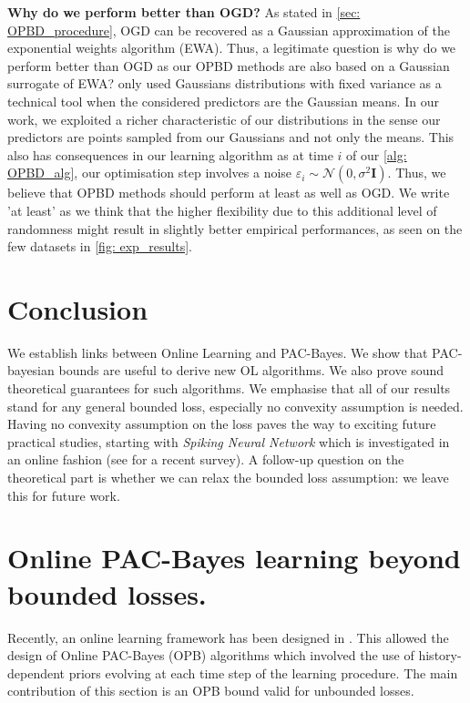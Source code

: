 \textbf{Why do we perform better than OGD?} As stated in \cref{sec: OPBD_procedure}, OGD can be recovered as a Gaussian approximation of the exponential weights algorithm (EWA). Thus, a legitimate question is why do we perform better than OGD as our OPBD methods are also based on a Gaussian surrogate of EWA?  \cite{hoeven2018many} only used Gaussians distributions with fixed variance as a technical tool when the considered predictors are the Gaussian means. In our work, we exploited a richer characteristic of our distributions in the sense our predictors are points sampled from our Gaussians and not only the means. This also has consequences in our learning algorithm as at time $i$ of our \cref{alg: OPBD_alg}, our optimisation step involves a noise $\varepsilon_i\sim \mathcal{N}(0,\sigma^2\mathbf{I})$. Thus, we believe that OPBD methods should perform at least as well as OGD.
We write 'at least' as we think that the higher flexibility due to this additional level of randomness might result in slightly better empirical performances, as seen on the few datasets in \cref{fig: exp_results}.




\section{Conclusion}

We establish links between Online Learning and PAC-Bayes. We show that PAC-bayesian bounds are useful to derive new OL algorithms. We also prove sound theoretical guarantees for such algorithms. We emphasise that all of our results stand for any general bounded loss, especially no convexity assumption is needed.
Having no convexity assumption on the loss paves the way to exciting future practical studies, starting with \emph{Spiking Neural Network} which is investigated in an online fashion (see \citealp{lobo2020spiking} for a recent survey). A follow-up question on the theoretical part is whether we can relax the bounded loss assumption: we leave this for future work.









\section{Online PAC-Bayes learning beyond bounded losses.}
\label{sec: main_result_onl}

Recently, an online learning framework has been designed in \citet{haddouche2022online}. This allowed the design of Online PAC-Bayes (OPB) algorithms which involved the use of history-dependent priors evolving at each time step of the learning procedure. The main contribution of this section is an OPB bound valid for unbounded losses.

